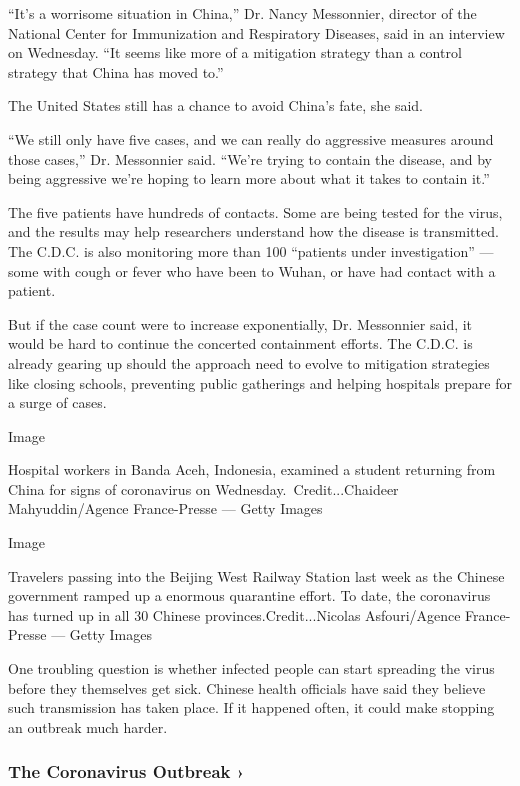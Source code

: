 ``It's a worrisome situation in China,'' Dr. Nancy Messonnier, director
of the National Center for Immunization and Respiratory Diseases, said
in an interview on Wednesday. ``It seems like more of a mitigation
strategy than a control strategy that China has moved to.''

The United States still has a chance to avoid China's fate, she said.

``We still only have five cases, and we can really do aggressive
measures around those cases,'' Dr. Messonnier said. ``We're trying to
contain the disease, and by being aggressive we're hoping to learn more
about what it takes to contain it.''

The five patients have hundreds of contacts. Some are being tested for
the virus, and the results may help researchers understand how the
disease is transmitted. The C.D.C. is also monitoring more than 100
``patients under investigation'' --- some with cough or fever who have
been to Wuhan, or have had contact with a patient.

But if the case count were to increase exponentially, Dr. Messonnier
said, it would be hard to continue the concerted containment efforts.
The C.D.C. is already gearing up should the approach need to evolve to
mitigation strategies like closing schools, preventing public gatherings
and helping hospitals prepare for a surge of cases.

Image

Hospital workers in Banda Aceh, Indonesia, examined a student returning
from China for signs of coronavirus on Wednesday.~Credit...Chaideer
Mahyuddin/Agence France-Presse --- Getty Images

Image

Travelers passing into the Beijing West Railway Station last week as the
Chinese government ramped up a enormous quarantine effort. To date, the
coronavirus has turned up in all 30 Chinese provinces.Credit...Nicolas
Asfouri/Agence France-Presse --- Getty Images

One troubling question is whether infected people can start spreading
the virus before they themselves get sick. Chinese health officials have
said they believe such transmission has taken place. If it happened
often, it could make stopping an outbreak much harder.

\href{https://www.nytimes.com/news-event/coronavirus?action=click\&pgtype=Article\&state=default\&region=MAIN_CONTENT_3\&context=storylines_faq}{}

\hypertarget{the-coronavirus-outbreak-}{%
\subsubsection{The Coronavirus Outbreak
›}\label{the-coronavirus-outbreak-}}

